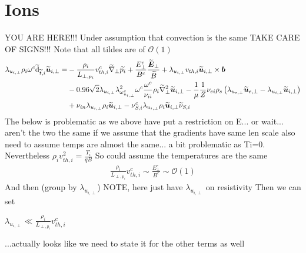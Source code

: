\section{Ions}
%
YOU ARE HERE!!!
Under assumption that convection is the same
TAKE CARE OF SIGNS!!!
Note that all tildes are of $\mathcal{O}(1)$
%
\begin{align*}
 \lambda_{u_{i,\perp}}
 \rho_i
 \omega^c
 \widetilde{ \text{d}}_{\widetilde{ t},i} \widetilde{ \boldsymbol{u}}_{i,\perp}
 =&
 -
 \frac{\rho_i}{L_{\perp, p_i}}v^c_{th,i}
 \widetilde{ \nabla}_\perp \widetilde{ p_i}
 +
 \frac{E_\perp^c}{B^c}
 \frac{\widetilde{ \boldsymbol{E}}_\perp}{\widetilde{ B}}
 +
 \lambda_{u_{i,\perp}}
 v_{th,i}
 \widetilde{ \boldsymbol{u}}_{i,\perp}\times\boldsymbol{b}
 \\&
 -
0.96\sqrt{2}
 \lambda_{u_{i,\perp}}
\lambda_{\omega^c_{u_{i,\perp}}}^2
 \omega^c
\frac{\omega^c}{\nu_{ii} }
\rho_i
\widetilde{ \nabla}_\perp^2\widetilde{ \boldsymbol{u}}_{i,\perp}
-
\frac{1}{\mu}
\frac{1}{Z}
\nu_{ei}
\rho_s
\left( \lambda_{u_{e,\perp}}\widetilde{ \boldsymbol{u}}_{e,\perp}-\lambda_{u_{i,\perp}}\widetilde{ \boldsymbol{u}}_{i,\perp}\right)
 \\&
 +
\nu_{i n}\lambda_{u_{i,\perp}}\rho_i\widetilde{ \boldsymbol{u}}_{i,\perp}
-
\nu^c_{S,i}\lambda_{u_{i,\perp}}\rho_i\widetilde{ \boldsymbol{u}}_{i,\perp} \widetilde{ \nu}_{S,i}
\end{align*}
%
The below is problematic as we above have put a restriction on E...
or wait...
aren't the two the same if we assume that the gradients have same len scale
also need to assume temps are almost the same...
a bit problematic as Ti=0.
Nevertheless
$\rho_iv_{th,i}^2=\frac{T_i}{qB}$
So could assume the temperatures are the same
%
\begin{align*}
 \frac{\rho_i}{L_{\perp, p_i}}v^c_{th,i}
 \sim
 \frac{E_\perp^c}{B^c}
 \sim
 \mathcal{O}(1)
\end{align*}
%
And then (group by $\lambda_{u_{i,\perp}}$)
NOTE, here just have $\lambda_{u_{i,\perp}}$ on resistivity
Then we can set

$\lambda_{u_{i,\perp}} \ll \frac{\rho_i}{L_{\perp, p_i}}v^c_{th,i}$

...actually looks like we need to state it for the other terms as well

